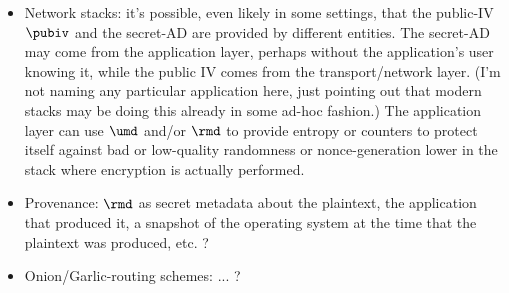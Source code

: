 \begin{itemize}
%
\item Network stacks: it's possible, even likely in some settings, that the public-IV~$\pubiv$ and the secret-AD are provided by different entities.  The secret-AD may come from the application layer, perhaps without the application's user knowing it, while the public IV comes from the transport/network layer. (I'm not naming any particular application here, just pointing out that modern stacks may be doing this already in some ad-hoc fashion.)  The application layer can use $\umd$ and/or $\rmd$ to provide entropy or counters to protect itself against bad or low-quality randomness or nonce-generation lower in the stack where encryption is actually performed.
%
\item Provenance: $\rmd$ as secret metadata about the plaintext, the application that produced it, a snapshot of the operating system at the time that the plaintext was produced, etc. ?
%
\item Onion/Garlic-routing schemes: ... ?

\end{itemize}
